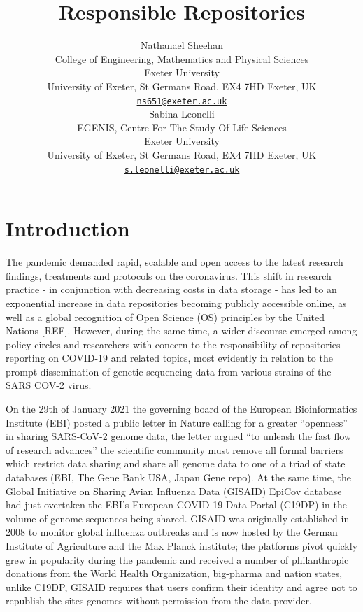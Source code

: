 \documentclass{article}
\title{Responsible Repositories}
\author{
    Nathanael Sheehan
   \\
    College of Engineering, Mathematics and Physical Sciences \\
    Exeter University \\
  University of Exeter, St Germans Road, EX4 7HD Exeter, UK \\
  \texttt{\href{mailto:ns651@exeter.ac.uk}{\nolinkurl{ns651@exeter.ac.uk}}} \\
   \And
    Sabina Leonelli
   \\
    EGENIS, Centre For The Study Of Life Sciences \\
    Exeter University \\
  University of Exeter, St Germans Road, EX4 7HD Exeter, UK \\
  \texttt{\href{mailto:s.leonelli@exeter.ac.uk}{\nolinkurl{s.leonelli@exeter.ac.uk}}} \\
  }
\begin{document}
\maketitle


\begin{abstract}

\end{abstract}


\hypertarget{introduction}{%
\section{Introduction}\label{introduction}}

The pandemic demanded rapid, scalable and open access to the latest
research findings, treatments and protocols on the coronavirus. This
shift in research practice - in conjunction with decreasing costs in
data storage - has led to an exponential increase in data repositories
becoming publicly accessible online, as well as a global recognition of
Open Science (OS) principles by the United Nations {[}REF{]}. However,
during the same time, a wider discourse emerged among policy circles and
researchers with concern to the responsibility of repositories reporting
on COVID-19 and related topics, most evidently in relation to the prompt
dissemination of genetic sequencing data from various strains of the
SARS COV-2 virus.

On the 29th of January 2021 the governing board of the European
Bioinformatics Institute (EBI) posted a public letter in Nature calling
for a greater ``openness'' in sharing SARS-CoV-2 genome data, the letter
argued ``to unleash the fast flow of research advances'' the scientific
community must remove all formal barriers which restrict data sharing
and share all genome data to one of a triad of state databases (EBI, The
Gene Bank USA, Japan Gene repo). At the same time, the Global Initiative
on Sharing Avian Influenza Data (GISAID) EpiCov database had just
overtaken the EBI's European COVID-19 Data Portal (C19DP) in the volume
of genome sequences being shared. GISAID was originally established in
2008 to monitor global influenza outbreaks and is now hosted by the
German Institute of Agriculture and the Max Planck institute; the
platforms pivot quickly grew in popularity during the pandemic and
received a number of philanthropic donations from the World Health
Organization, big-pharma and nation states, unlike C19DP, GISAID
requires that users confirm their identity and agree not to republish
the sites genomes without permission from the data provider.
\end{document}
